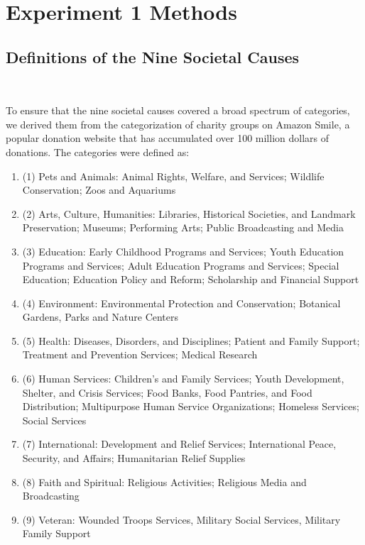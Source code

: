 \appendix

\section{Experiment 1 Methods}
\subsection{Definitions of the Nine Societal Causes}~\label{cause_def}

To ensure that the nine societal causes covered a broad spectrum of categories, we derived them from the categorization of charity groups on Amazon Smile, a popular donation website that has accumulated over 100 million dollars of donations. The categories were defined as:
\begin{enumerate}[label={},leftmargin=\parindent]
    \item (1) Pets and Animals: Animal Rights, Welfare, and Services; Wildlife Conservation; Zoos and Aquariums
    \item (2) Arts, Culture, Humanities: Libraries, Historical Societies, and Landmark Preservation; Museums; Performing Arts; Public Broadcasting and Media
    \item (3) Education: Early Childhood Programs and Services; Youth Education Programs and Services; Adult Education Programs and Services; Special Education; Education Policy and Reform; Scholarship and Financial Support
    \item (4) Environment: Environmental Protection and Conservation; Botanical Gardens, Parks and Nature Centers
    \item (5) Health: Diseases, Disorders, and Disciplines; Patient and Family Support; Treatment and Prevention Services; Medical Research
    \item (6) Human Services: Children's and Family Services; Youth Development, Shelter, and Crisis Services; Food Banks, Food Pantries, and Food Distribution; Multipurpose Human Service Organizations; Homeless Services; Social Services
    \item (7) International: Development and Relief Services; International Peace, Security, and Affairs; Humanitarian Relief Supplies
    \item (8) Faith and Spiritual: Religious Activities; Religious Media and Broadcasting
    \item (9) Veteran: Wounded Troops Services, Military Social Services, Military Family Support
\end{enumerate}

